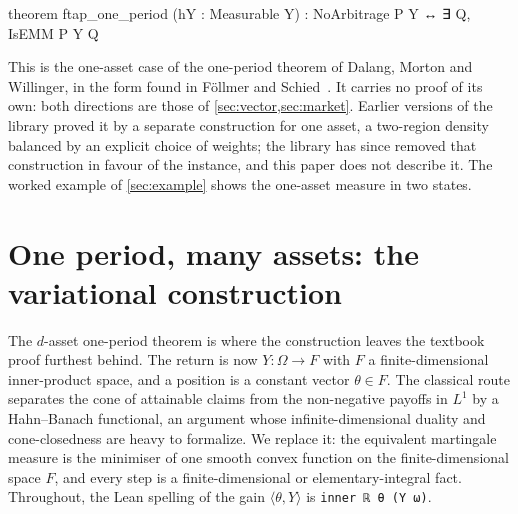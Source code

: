 \documentclass[11pt]{article}
\begin{document}
\begin{leancode}[caption={The scalar one-period theorem (\texttt{Foundations/FTAPOnePeriod}); $Y:\Omega\to\mathbb{R}$ on an arbitrary probability space.},label=lst:scalar]
theorem ftap_one_period (hY : Measurable Y) :
    NoArbitrage P Y ↔ ∃ Q, IsEMM P Y Q
\end{leancode}

This is the one-asset case of the one-period theorem of Dalang, Morton and Willinger, in the form found
in Föllmer and Schied~\cite[Ch.~1]{FollmerSchied2016}. It carries no proof of its own: both directions are those of
\cref{sec:vector,sec:market}. Earlier versions of the library proved it by a separate construction for one
asset, a two-region density balanced by an explicit choice of weights; the library has since removed that construction in
favour of the instance, and this paper does not describe it. The worked example of \cref{sec:example} shows the
one-asset measure in two states.

\section{One period, many assets: the variational construction}\label{sec:vector}

The $d$-asset one-period theorem is where the construction leaves the textbook proof furthest behind.
The return is now $Y\colon\Omega\to F$ with $F$ a finite-dimensional inner-product space, and a position
is a constant vector $\theta\in F$. The classical route separates the cone of attainable claims from the
non-negative payoffs in $L^1$ by a Hahn--Banach functional, an argument whose infinite-dimensional
duality and cone-closedness are heavy to formalize. We replace it: the equivalent martingale measure is
the minimiser of one smooth convex function on the finite-dimensional space $F$, and every step is a
finite-dimensional or elementary-integral fact. Throughout, the Lean spelling of the gain
$\langle\theta,Y\rangle$ is \lstinline|inner ℝ θ (Y ω)|.
\end{document}
